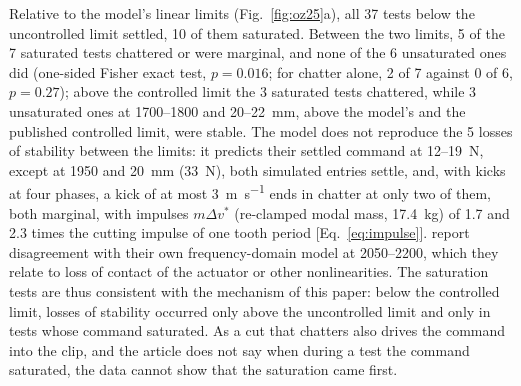 Relative to the model's linear limits (Fig.~\ref{fig:oz25}a), all 37 tests below the uncontrolled limit settled, 10 of them saturated. Between the two limits, 5 of the 7 saturated tests chattered or were marginal, and none of the 6 unsaturated ones did (one-sided Fisher exact test, $p=0.016$; for chatter alone, 2 of 7 against 0 of 6, $p=0.27$); above the controlled limit the 3 saturated tests chattered, while 3 unsaturated ones at 1700--\SI{1800}{\rpm} and 20--\SI{22}{\milli\metre}, above the model's and the published controlled limit, were stable. The model does not reproduce the 5 losses of stability between the limits: it predicts their settled command at 12--\SI{19}{\newton}, except at \SI{1950}{\rpm} and \SI{20}{\milli\metre} (\SI{33}{\newton}), both simulated entries settle, and, with kicks at four phases, a kick of at most \SI{3}{\metre\per\second} ends in chatter at only two of them, both marginal, with impulses $m\Delta v^*$ (re-clamped modal mass, \SI{17.4}{\kilogram}) of 1.7 and 2.3 times the cutting impulse of one tooth period [Eq.~\eqref{eq:impulse}]. \citet{ozsoy2025frequency} report disagreement with their own frequency-domain model at 2050--\SI{2200}{\rpm}, which they relate to loss of contact of the actuator or other nonlinearities. The saturation tests are thus consistent with the mechanism of this paper: below the controlled limit, losses of stability occurred only above the uncontrolled limit and only in tests whose command saturated. As a cut that chatters also drives the command into the clip, and the article does not say when during a test the command saturated, the data cannot show that the saturation came first.

